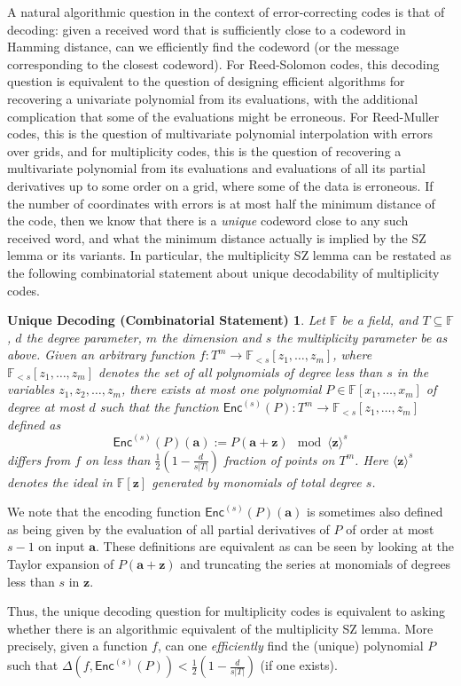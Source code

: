 \documentclass{theoretics}
\def\Field{\mathbb{F}}
\let\F\Field
\def\veca{\mathbf{a}}
\def\vecz{\mathbf{z}}
\newtheorem*{combSZ}{Unique Decoding (Combinatorial Statement)}
\newcommand{\enc}{{\mathsf{Enc}}}
\newcommand{\vz}{\vecz}
\newcommand{\va}{\veca}
\begin{document}
	A natural algorithmic question in the context of error-correcting codes is that of decoding: given a received word that is sufficiently close to a codeword in Hamming distance, can we efficiently find the codeword (or the message corresponding to the closest codeword). For Reed-Solomon codes, this decoding question is equivalent to the question of designing efficient algorithms for recovering a univariate polynomial from its evaluations, with the additional complication that some of the evaluations might be erroneous. For Reed-Muller codes, this is the question of multivariate polynomial interpolation with errors over grids, and for multiplicity codes, this is the question of recovering a multivariate polynomial from its evaluations and evaluations of all its partial derivatives up to some order on  a grid, where some of the data is erroneous.  If the number of coordinates with errors is at most half the minimum distance of the code, then we know that there is a \emph{unique} codeword close to any such received word, and what the minimum distance actually is implied by the SZ lemma or its variants. In particular, the multiplicity SZ lemma can be restated as the following combinatorial statement about unique decodability of multiplicity codes. 
	\begin{combSZ}\label{thm:question}
		Let $\F$ be a field, and $T \subseteq \F$, $d$ the degree parameter,
		$m$ the dimension and $s$ the multiplicity parameter be as
		above. Given an arbitrary function
		$f\colon T^{m} \to \F_{<s}[z_1,\ldots,z_m]$, where $\F_{<s}[z_1,\ldots,z_m]$ denotes the set of all polynomials of degree less than $s$ in the variables $z_1,z_2,\ldots,z_m$, there exists \emph{at most
			one} polynomial $P \in \F[x_1, \ldots, x_m]$ of degree at most $d$
		such that the function $\enc^{(s)}(P)\colon T^{m} \to \F_{<s}[z_1,\ldots,z_m]$
		defined as
		\[
		\enc^{(s)}(P)(\va) := P(\va + \vz) \mod \langle \vz
		\rangle^s 
		\]
		differs from $f$ on less than $\frac12\left(1-\frac{d}{s|T|}\right)$ fraction of points on $T^m$. 
		Here $\langle \vz \rangle^s $ denotes the ideal in $\F[\vz]$ generated by monomials of total degree $s$.
	\end{combSZ}
	\begin{remark}
		We note that the encoding function $\enc^{(s)}(P)(\va)$ is sometimes also  defined as being given by the evaluation of all partial derivatives of $P$ of order at most $s-1$ on input $\va$. These definitions are equivalent as can be seen by looking at the Taylor expansion of $P(\va + \vz)$ and truncating the series at monomials of degrees less than $s$ in $\vz$.  
	\end{remark}
	Thus, the unique decoding question for multiplicity codes is equivalent to asking whether there is an algorithmic equivalent of the multiplicity SZ lemma. More precisely, given a function $f$, can one \emph{efficiently} find the (unique)
	polynomial $P$ such that
	$\Delta(f,\enc^{(s)}(P)) <\frac12\left(1-\frac{d}{s|T|}\right)$ (if one
	exists). 
	
\end{document}
